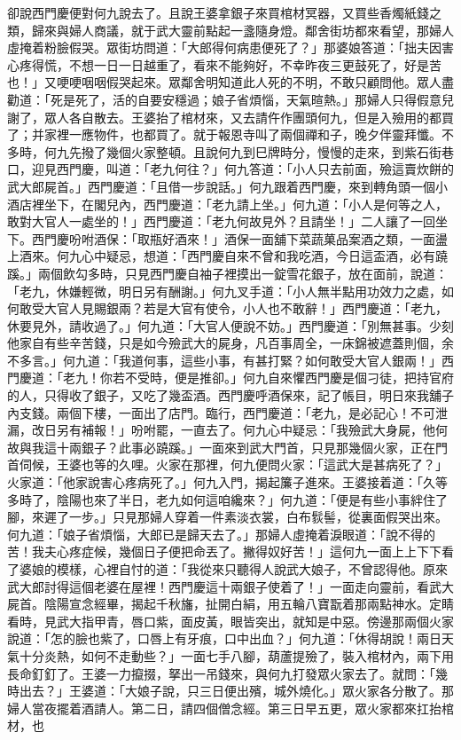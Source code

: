 \begin{showcontents}{}
卻說西門慶便對何九說去了。且說王婆拿銀子來買棺材冥器，又買些香燭紙錢之類，歸來與婦人商議，就于武大靈前點起一盞隨身燈。鄰舍街坊都來看望，那婦人虛掩着粉臉假哭。眾街坊問道：「大郎得何病患便死了？」那婆娘答道：「拙夫因害心疼得慌，不想一日一日越重了，看來不能夠好，不幸昨夜三更鼓死了，好是苦也！」又哽哽咽咽假哭起來。眾鄰舍明知道此人死的不明，不敢只顧問他。眾人盡勸道：「死是死了，活的自要安穩過；娘子省煩惱，天氣暄熱。」那婦人只得假意兒謝了，眾人各自散去。王婆抬了棺材來，又去請仵作團頭何九，但是入殮用的都買了；并家裡一應物件，也都買了。就于報恩寺叫了兩個禪和子，晚夕伴靈拜懺。不多時，何九先撥了幾個火家整頓。且說何九到巳牌時分，慢慢的走來，到紫石街巷口，迎見西門慶，叫道：「老九何往？」何九答道：「小人只去前面，殮這賣炊餅的武大郎屍首。」西門慶道：「且借一步說話。」何九跟着西門慶，來到轉角頭一個小酒店裡坐下，在閣兒內，西門慶道：「老九請上坐。」何九道：「小人是何等之人，敢對大官人一處坐的！」西門慶道：「老九何故見外？且請坐！」二人讓了一回坐下。西門慶吩咐酒保：「取瓶好酒來！」酒保一面舖下菜蔬菓品案酒之類，一面盪上酒來。何九心中疑忌，想道：「西門慶自來不曾和我吃酒，今日這盃酒，必有蹺蹊。」兩個飲勾多時，只見西門慶自袖子裡摸出一錠雪花銀子，放在面前，說道：「老九，休嫌輕微，明日另有酬謝。」何九叉手道：「小人無半點用功效力之處，如何敢受大官人見賜銀兩？若是大官有使令，小人也不敢辭！」西門慶道：「老九，休要見外，請收過了。」何九道：「大官人便說不妨。」西門慶道：「別無甚事。少刻他家自有些辛苦錢，只是如今殮武大的屍身，凡百事周全，一床錦被遮蓋則個，余不多言。」何九道：「我道何事，這些小事，有甚打緊？如何敢受大官人銀兩！」西門慶道：「老九！你若不受時，便是推卻。」何九自來懼西門慶是個刁徒，把持官府的人，只得收了銀子，又吃了幾盃酒。西門慶呼酒保來，記了帳目，明日來我舖子內支錢。兩個下樓，一面出了店門。臨行，西門慶道：「老九，是必記心！不可泄漏，改日另有補報！」吩咐罷，一直去了。何九心中疑忌：「我殮武大身屍，他何故與我這十兩銀子？此事必蹺蹊。」一面來到武大門首，只見那幾個火家，正在門首伺候，王婆也等的久哩。火家在那裡，何九便問火家：「這武大是甚病死了？」火家道：「他家說害心疼病死了。」何九入門，揭起簾子進來。王婆接着道：「久等多時了，陰陽也來了半日，老九如何這咱纔來？」何九道：「便是有些小事絆住了腳，來遲了一步。」只見那婦人穿着一件素淡衣裳，白布䯼髻，從裏面假哭出來。何九道：「娘子省煩惱，大郎已是歸天去了。」那婦人虛掩着淚眼道：「說不得的苦！我夫心疼症候，幾個日子便把命丟了。撇得奴好苦！」這何九一面上上下下看了婆娘的模樣，心裡自忖的道：「我從來只聽得人說武大娘子，不曾認得他。原來武大郎討得這個老婆在屋裡！西門慶這十兩銀子使着了！」一面走向靈前，看武大屍首。陰陽宣念經畢，揭起千秋旛，扯開白絹，用五輪八寶翫着那兩點神水。定睛看時，見武大指甲青，唇口紫，面皮黃，眼皆突出，就知是中惡。傍邊那兩個火家說道：「怎的臉也紫了，口唇上有牙痕，口中出血？」何九道：「休得胡說！兩日天氣十分炎熱，如何不走動些？」一面七手八腳，葫蘆提殮了，裝入棺材內，兩下用長命釘釘了。王婆一力攛掇，拏出一吊錢來，與何九打發眾火家去了。就問：「幾時出去？」王婆道：「大娘子說，只三日便出殯，城外燒化。」眾火家各分散了。那婦人當夜擺着酒請人。第二日，請四個僧念經。第三日早五更，眾火家都來扛抬棺材，也
\end{showcontents}
